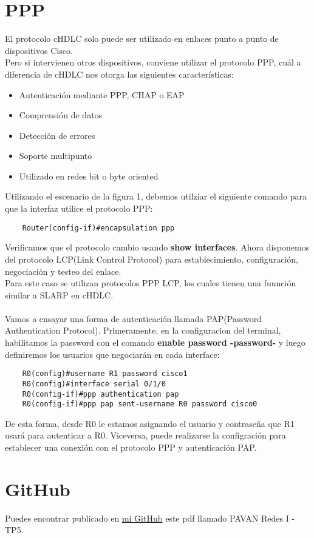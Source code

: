 \documentclass{article}
\begin{document}
\section{PPP}
El protocolo cHDLC solo puede ser utilizado en enlaces punto a punto de dispositivos Cisco.
\\Pero si intervienen otros dispositivos, conviene utilizar el protocolo PPP, cuál a diferencia de cHDLC nos otorga las siguientes características:
\begin{itemize}
    \item Autenticación mediante PPP, CHAP o EAP 
    \item Comprensión de datos
    \item Detección de errores
    \item Soporte multipunto
    \item Utilizado en redes bit o byte oriented
\end{itemize}
Utilizando el escenario de la figura 1, debemos utilziar el siguiente comando para que la interfaz utilice el protocolo PPP:
\begin{lstlisting}
    Router(config-if)#encapsulation ppp
\end{lstlisting} 
Verificamos que el protocolo cambio usando \textbf{show interfaces}. Ahora disponemos del protocolo LCP(Link Control Protocol) para establecimiento, configuración, negociación y testeo del enlace.
\\Para este caso se utilizan protocolos PPP LCP, los cuales tienen una fuunción similar a SLARP en cHDLC.
\\\\
Vamos a ensayar una forma de autenticación llamada PAP(Password Authentication Protocol). Primeramente, en la configuracion del terminal, habilitamos la password con el comando \textbf{enable password -password-} y luego definiremos los usuarios que negociarán en cada interface:
\begin{lstlisting}
    R0(config)#username R1 password cisco1
    R0(config)#interface serial 0/1/0
    R0(config-if)#ppp authentication pap
    R0(config-if)#ppp pap sent-username R0 password cisco0
\end{lstlisting}
De esta forma, desde R0 le estamos asignando el usuario y contraseña que R1 usará para autenticar a R0. Viceversa, puede realizarse la configración para establecer una conexión con el protocolo PPP y autenticación PAP.
\section{GitHub}
Puedes encontrar publicado en \href{https://github.com/martinpavan1/redes1}{mi GitHub} este pdf llamado PAVAN Redes I - TP5.
\end{document}
